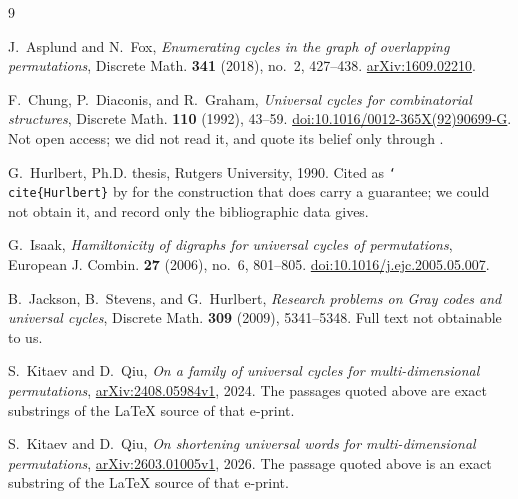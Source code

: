 \documentclass[11pt]{amsart}
\begin{document}
\begin{thebibliography}{9}

J.~Asplund and N.~Fox,
\emph{Enumerating cycles in the graph of overlapping permutations},
Discrete Math. \textbf{341} (2018), no.~2, 427--438.
\href{https://arxiv.org/abs/1609.02210}{arXiv:1609.02210}.

F.~Chung, P.~Diaconis, and R.~Graham,
\emph{Universal cycles for combinatorial structures},
Discrete Math. \textbf{110} (1992), 43--59.
\href{https://doi.org/10.1016/0012-365X(92)90699-G}
{doi:10.1016/0012-365X(92)90699-G}.
Not open access; we did not read it, and quote its belief only through
\cite{KQ2024,KQ2026}.

G.~Hurlbert,
Ph.D. thesis, Rutgers University, 1990.
Cited as \texttt{\char`\\cite\{Hurlbert\}} by \cite{KQ2024} for the
construction that does carry a guarantee; we could not obtain it, and record
only the bibliographic data \cite{KQ2024} gives.

G.~Isaak,
\emph{Hamiltonicity of digraphs for universal cycles of permutations},
European J. Combin. \textbf{27} (2006), no.~6, 801--805.
\href{https://doi.org/10.1016/j.ejc.2005.05.007}
{doi:10.1016/j.ejc.2005.05.007}.

B.~Jackson, B.~Stevens, and G.~Hurlbert,
\emph{Research problems on Gray codes and universal cycles},
Discrete Math. \textbf{309} (2009), 5341--5348.
Full text not obtainable to us.

S.~Kitaev and D.~Qiu,
\emph{On a family of universal cycles for multi-dimensional permutations},
\href{https://arxiv.org/abs/2408.05984}{arXiv:2408.05984v1}, 2024.
The passages quoted above are exact substrings of the \LaTeX{} source of that
e-print.

S.~Kitaev and D.~Qiu,
\emph{On shortening universal words for multi-dimensional permutations},
\href{https://arxiv.org/abs/2603.01005}{arXiv:2603.01005v1}, 2026.
The passage quoted above is an exact substring of the \LaTeX{} source of that
e-print.

\end{thebibliography}
\end{document}

